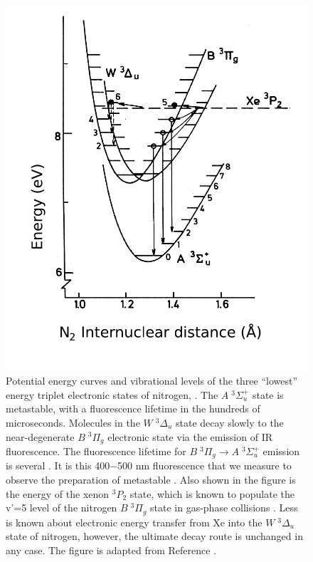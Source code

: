 \documentclass[12pt]{mitthesis}
\begin{document}
\begin{figure}
  \caption{Potential energy curves and vibrational levels of the three
    ``lowest'' energy triplet electronic states of nitrogen, .
    The $A \; ^3\Sigma_u^+$ state is metastable, with a fluorescence
    lifetime in the hundreds of microseconds.  Molecules in the $W \;
    ^3\Delta_u$ state decay slowly to the near-degenerate $B \;
    ^3\Pi_g$ electronic state via the emission of IR fluorescence.
    The fluorescence lifetime for $B \; ^3\Pi_g \rightarrow A \;
    ^3\Sigma_u^+$ emission is several \microsec. It is this 400$-$500
    nm fluorescence that we measure to observe the preparation of
    metastable .  Also shown in the figure is the energy of the
    xenon $^3P_2$ state, which is known to populate the v'=5 level of
    the nitrogen $B \; ^3\Pi_g$ state in gas-phase collisions
    \cite{krumpelmann87}.  Less is known about electronic energy
    transfer from Xe into the $W \; ^3\Delta_u$ state of nitrogen,
    however, the ultimate decay route is unchanged in any case.  The
    figure is adapted from Reference \cite{krumpelmann-thesis}.}
  \label{fig:n2curves}
  \centering
  \includegraphics[width=5in]{n2curves.pdf}
\end{figure}
\end{document}
